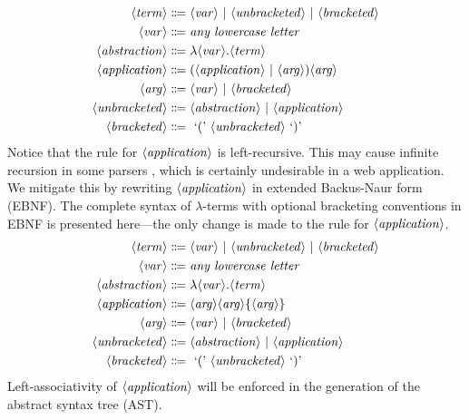 \begin{align*}
    \langle\mathit{term}\rangle &\Coloneqq \langle\mathit{var}\rangle \ |\  \langle\mathit{unbracketed}\rangle \ |\  \langle\mathit{bracketed}\rangle \\
    \langle\mathit{var}\rangle  &\Coloneqq \textit{any lowercase letter} \\
    \langle\mathit{abstraction}\rangle &\Coloneqq \lambda \langle\mathit{var}\rangle. \langle\mathit{term}\rangle \\
    \langle\mathit{application}\rangle &\Coloneqq (\langle\mathit{application}\rangle \ |\  \langle\mathit{arg}\rangle) \langle\mathit{arg}\rangle \\
    \langle\mathit{arg}\rangle &\Coloneqq \langle\mathit{var}\rangle \ |\  \langle\mathit{bracketed}\rangle \\
    \langle\mathit{unbracketed}\rangle &\Coloneqq \langle\mathit{abstraction}\rangle \ |\  \langle\mathit{application}\rangle \\
    \langle\mathit{bracketed}\rangle &\Coloneqq \text{ `(' } \langle\mathit{unbracketed}\rangle \text{ `)' }
\end{align*}
Notice that the rule for $\langle\mathit{application}\rangle$ is left-recursive. This may cause infinite recursion in some parsers , which is certainly undesirable in a web application. We mitigate this by rewriting $\langle\mathit{application}\rangle$ in extended Backus-Naur form (EBNF). The complete syntax of $\lambda$-terms with optional bracketing conventions in EBNF is presented here---the only change is made to the rule for $\langle\mathit{application}\rangle$.
\begin{align*}
    \langle\mathit{term}\rangle &\Coloneqq \langle\mathit{var}\rangle \ |\  \langle\mathit{unbracketed}\rangle \ |\  \langle\mathit{bracketed}\rangle \\
    \langle\mathit{var}\rangle  &\Coloneqq \textit{any lowercase letter} \\
    \langle\mathit{abstraction}\rangle &\Coloneqq \lambda \langle\mathit{var}\rangle. \langle\mathit{term}\rangle \\
    \langle\mathit{application}\rangle &\Coloneqq \langle\mathit{arg}\rangle \langle\mathit{arg}\rangle \{\langle\mathit{arg}\rangle\} \\
    \langle\mathit{arg}\rangle &\Coloneqq \langle\mathit{var}\rangle \ |\  \langle\mathit{bracketed}\rangle \\
    \langle\mathit{unbracketed}\rangle &\Coloneqq \langle\mathit{abstraction}\rangle \ |\  \langle\mathit{application}\rangle \\
    \langle\mathit{bracketed}\rangle &\Coloneqq \text{ `(' } \langle\mathit{unbracketed}\rangle \text{ `)' }
\end{align*}
Left-associativity of $\langle\mathit{application}\rangle$ will be enforced in the generation of the abstract syntax tree (AST).

